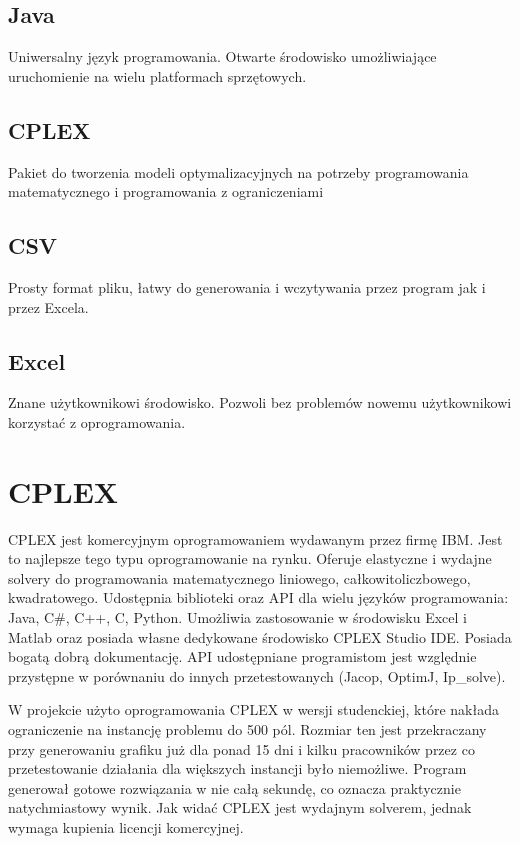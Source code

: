 \documentclass{article}
\begin{document}
\subsection{Java}
Uniwersalny język programowania. Otwarte środowisko umożliwiające uruchomienie na wielu platformach sprzętowych. 

\subsection{CPLEX}
Pakiet do tworzenia modeli optymalizacyjnych na potrzeby programowania matematycznego i programowania z ograniczeniami

\subsection{CSV}
Prosty format pliku, łatwy do generowania i wczytywania przez program jak i przez Excela. 

\subsection{Excel}
Znane użytkownikowi środowisko. Pozwoli bez problemów nowemu użytkownikowi korzystać z oprogramowania. 

\section{CPLEX}

CPLEX jest komercyjnym oprogramowaniem wydawanym przez firmę IBM. Jest to najlepsze tego typu oprogramowanie na rynku. Oferuje elastyczne i wydajne solvery do programowania matematycznego liniowego, całkowitoliczbowego, kwadratowego. Udostępnia biblioteki oraz API dla wielu języków programowania: Java, C\#, C++, C, Python. Umożliwia zastosowanie w środowisku Excel i Matlab oraz posiada własne dedykowane środowisko CPLEX Studio IDE. Posiada bogatą dobrą dokumentację. API udostępniane programistom jest względnie przystępne w porównaniu do innych przetestowanych (Jacop, OptimJ, Ip\_solve). \par
W projekcie użyto oprogramowania CPLEX w wersji studenckiej, które nakłada ograniczenie na instancję problemu do 500 pól. Rozmiar ten jest przekraczany przy generowaniu grafiku już dla ponad 15 dni i kilku pracowników przez co przetestowanie działania dla większych instancji było niemożliwe. Program generował gotowe rozwiązania w nie całą sekundę, co oznacza praktycznie natychmiastowy wynik. Jak widać CPLEX jest wydajnym solverem, jednak wymaga kupienia licencji komercyjnej.
\end{document}
